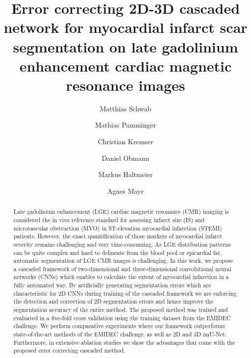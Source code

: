 \documentclass[preprint,5p,authoryear]{elsarticle}
\begin{document}

\begin{frontmatter}

\title{Error correcting 2D-3D cascaded network for myocardial infarct scar segmentation on late gadolinium enhancement cardiac magnetic resonance images}

\author[1]{Matthias Schwab}
\author[1]{Mathias Pamminger}
\author[1]{Christian Kremser}
\author[2]{Daniel Obmann}
\author[2]{Markus Haltmeier}
\author[1]{Agnes Mayr}





\begin{abstract}
Late gadolinium enhancement (LGE) cardiac magnetic resonance (CMR) imaging is considered the in vivo reference standard for assessing infarct size (IS) and microvascular obstruction (MVO) in ST-elevation myocardial infarction (STEMI) patients. However, the exact quantification of those markers of myocardial infarct severity remains challenging and very time-consuming. As LGE distribution patterns can be quite complex and hard to delineate from the blood pool or epicardial fat, automatic segmentation of LGE CMR images is challenging. In this work, we propose a cascaded framework of two-dimensional and three-dimensional convolutional neural networks (CNNs) which enables to calculate the extent of myocardial infarction in a fully automated way. By artificially generating segmentation errors which are characteristic for 2D CNNs during training of the cascaded framework we are enforcing the detection and correction of 2D segmentation errors and hence improve the segmentation accuracy of the entire method. The proposed method was trained and evaluated in a five-fold cross validation using the training dataset from the EMIDEC challenge. We perform comparative experiments where our framework outperforms state-of-the-art methods of the EMIDEC challenge, as well as 2D and 3D nnU-Net. Furthermore, in extensive ablation studies we show the advantages that come with the proposed error correcting cascaded method. %
\end{abstract}


\end{frontmatter}
\end{document}
